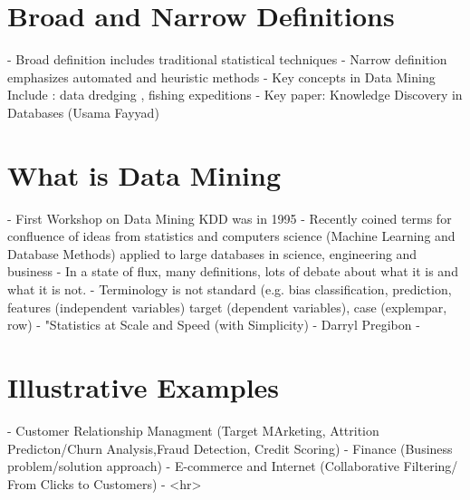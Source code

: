 
\section*{Broad and Narrow Definitions}
 
- Broad definition includes traditional statistical techniques
- Narrow definition emphasizes automated and heuristic methods
- Key concepts in Data Mining Include : data dredging , fishing expeditions
- Key paper: Knowledge Discovery in Databases (Usama Fayyad)

\section*{What is Data Mining}
- First Workshop on Data Mining KDD was in 1995
- Recently coined terms for confluence of ideas from statistics and computers science (Machine Learning and Database Methods) applied to 
large databases in science, engineering and business
- In a state of flux, many definitions, lots of debate about what it is and what it is not.
- Terminology is not standard (e.g. bias classification, prediction, features (independent variables)
target (dependent variables), case (explempar, row)
- "Statistics at Scale and Speed (with Simplicity) - Darryl Pregibon
- 
\section*{Illustrative Examples}
- Customer Relationship Managment (Target MArketing, Attrition Predicton/Churn Analysis,Fraud Detection, Credit Scoring)
- Finance  (Business problem/solution approach)
- E-commerce and Internet (Collaborative Filtering/ From Clicks to Customers)
- 
<hr>

